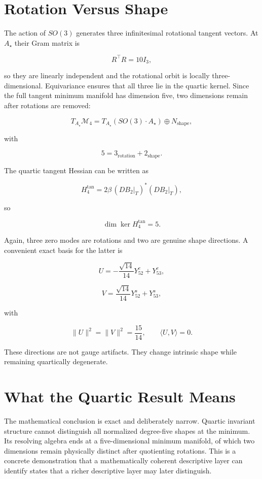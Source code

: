 \section{Rotation Versus Shape}

The action of $SO(3)$ generates three infinitesimal rotational tangent vectors. At $A_\star$ their Gram matrix is

\[
R^\top R=10I_3,
\]

so they are linearly independent and the rotational orbit is locally three-dimensional. Equivariance ensures that all three lie in the quartic kernel. Since the full tangent minimum manifold has dimension five, two dimensions remain after rotations are removed:

\[
T_{A_\star}\mathcal M_4
=
T_{A_\star}(SO(3)\cdot A_\star)
\oplus
N_{\mathrm{shape}},
\]

with

\[
5=3_{\mathrm{rotation}}+2_{\mathrm{shape}}.
\]

The quartic tangent Hessian can be written as

\[
H_4^{\mathrm{tan}}
=
2\beta\,(DB_2|_T)^*(DB_2|_T),
\]

so

\[
\dim\ker H_4^{\mathrm{tan}}=5.
\]

Again, three zero modes are rotations and two are genuine shape directions. A convenient exact basis for the latter is

\[
U=-\frac{\sqrt{14}}{14}Y_{52}^{c}+Y_{53}^{c},
\]

\[
V=\frac{\sqrt{14}}{14}Y_{52}^{s}+Y_{53}^{s},
\]

with

\[
\|U\|^2=\|V\|^2=\frac{15}{14},
\qquad
\langle U,V\rangle=0.
\]

These directions are not gauge artifacts. They change intrinsic shape while remaining quartically degenerate.

\section{What the Quartic Result Means}

The mathematical conclusion is exact and deliberately narrow. Quartic invariant structure cannot distinguish all normalized degree-five shapes at the minimum. Its resolving algebra ends at a five-dimensional minimum manifold, of which two dimensions remain physically distinct after quotienting rotations. This is a concrete demonstration that a mathematically coherent descriptive layer can identify states that a richer descriptive layer may later distinguish.

